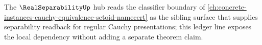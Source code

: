 The $\RealSeparabilityUp$ hub reads the classifier boundary of \autoref{ch:concrete-instances-cauchy-equivalence-setoid-namecert} as the sibling surface that supplies separability readback for regular Cauchy presentations; this ledger line exposes the local dependency without adding a separate theorem claim.

